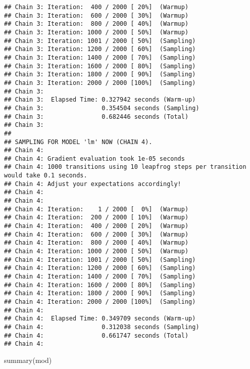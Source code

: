 \documentclass[
]{article}
\newenvironment{Shaded}{\begin{snugshade}}{\end{snugshade}}
\newcommand{\FunctionTok}[1]{\textcolor[rgb]{0.00,0.00,0.00}{#1}}
\newcommand{\NormalTok}[1]{#1}
\begin{document}
\begin{verbatim}
## Chain 3: Iteration:  400 / 2000 [ 20%]  (Warmup)
## Chain 3: Iteration:  600 / 2000 [ 30%]  (Warmup)
## Chain 3: Iteration:  800 / 2000 [ 40%]  (Warmup)
## Chain 3: Iteration: 1000 / 2000 [ 50%]  (Warmup)
## Chain 3: Iteration: 1001 / 2000 [ 50%]  (Sampling)
## Chain 3: Iteration: 1200 / 2000 [ 60%]  (Sampling)
## Chain 3: Iteration: 1400 / 2000 [ 70%]  (Sampling)
## Chain 3: Iteration: 1600 / 2000 [ 80%]  (Sampling)
## Chain 3: Iteration: 1800 / 2000 [ 90%]  (Sampling)
## Chain 3: Iteration: 2000 / 2000 [100%]  (Sampling)
## Chain 3: 
## Chain 3:  Elapsed Time: 0.327942 seconds (Warm-up)
## Chain 3:                0.354504 seconds (Sampling)
## Chain 3:                0.682446 seconds (Total)
## Chain 3: 
## 
## SAMPLING FOR MODEL 'lm' NOW (CHAIN 4).
## Chain 4: 
## Chain 4: Gradient evaluation took 1e-05 seconds
## Chain 4: 1000 transitions using 10 leapfrog steps per transition would take 0.1 seconds.
## Chain 4: Adjust your expectations accordingly!
## Chain 4: 
## Chain 4: 
## Chain 4: Iteration:    1 / 2000 [  0%]  (Warmup)
## Chain 4: Iteration:  200 / 2000 [ 10%]  (Warmup)
## Chain 4: Iteration:  400 / 2000 [ 20%]  (Warmup)
## Chain 4: Iteration:  600 / 2000 [ 30%]  (Warmup)
## Chain 4: Iteration:  800 / 2000 [ 40%]  (Warmup)
## Chain 4: Iteration: 1000 / 2000 [ 50%]  (Warmup)
## Chain 4: Iteration: 1001 / 2000 [ 50%]  (Sampling)
## Chain 4: Iteration: 1200 / 2000 [ 60%]  (Sampling)
## Chain 4: Iteration: 1400 / 2000 [ 70%]  (Sampling)
## Chain 4: Iteration: 1600 / 2000 [ 80%]  (Sampling)
## Chain 4: Iteration: 1800 / 2000 [ 90%]  (Sampling)
## Chain 4: Iteration: 2000 / 2000 [100%]  (Sampling)
## Chain 4: 
## Chain 4:  Elapsed Time: 0.349709 seconds (Warm-up)
## Chain 4:                0.312038 seconds (Sampling)
## Chain 4:                0.661747 seconds (Total)
## Chain 4:
\end{verbatim}

\begin{Shaded}
\begin{Highlighting}[]
\FunctionTok{summary}\NormalTok{(mod)}
\end{Highlighting}
\end{Shaded}
\end{document}
